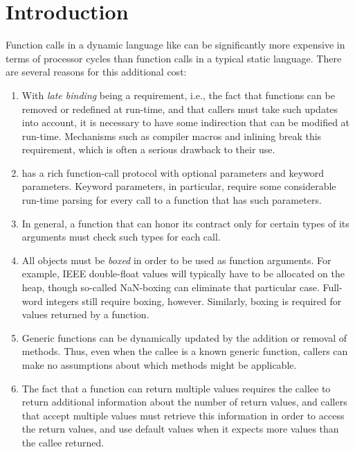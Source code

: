 \section{Introduction}
\label{sec-introduction}

Function calls in a dynamic language like \commonlisp{} can be
significantly more expensive in terms of processor cycles than
function calls in a typical static language.  There are several
reasons for this additional cost:

\begin{enumerate}
\item With \emph{late binding} being a requirement, i.e., the fact that
  functions can be removed or redefined at run-time, and that callers
  must take such updates into account, it is necessary to have some
  indirection that can be modified at run-time.  Mechanisms such as
  compiler macros and inlining break this requirement, which is often
  a serious drawback to their use.
\item \commonlisp{} has a rich function-call protocol with optional
  parameters and keyword parameters.  Keyword parameters, in
  particular, require some considerable run-time parsing for every
  call to a function that has such parameters.
\item In general, a function that can honor its contract only for
  certain types of its arguments must check such types for each call.
\item All objects must be \emph{boxed} in order to be used as function
  arguments.  For example, IEEE double-float values will typically
  have to be allocated on the heap, though so-called NaN-boxing
  \cite{Gudeman93representingtype} can eliminate that particular case.
  Full-word integers still require boxing, however.  Similarly, boxing
  is required for values returned by a function.
\item Generic functions can be dynamically updated by the addition or
  removal of methods.  Thus, even when the callee is a known generic
  function, callers can make no assumptions about which methods might
  be applicable.
\item The fact that a function can return multiple values requires the
  callee to return additional information about the number of
  return values, and callers that accept multiple values must retrieve
  this information in order to access the return values, and use
  default values when it expects more values than the callee
  returned.
\end{enumerate}

